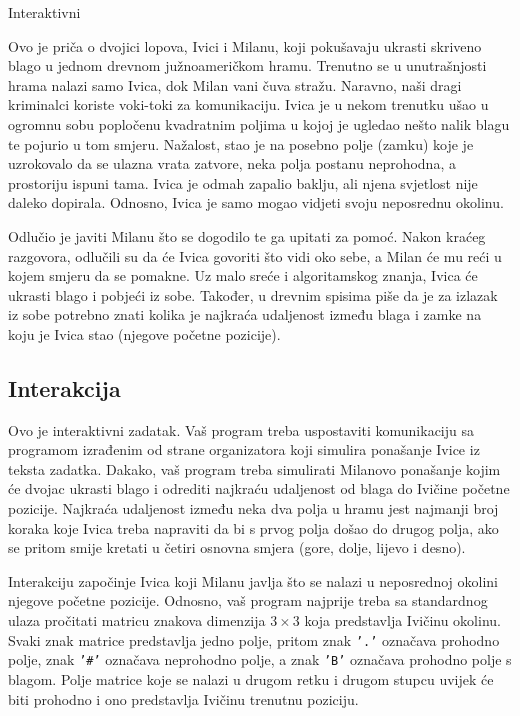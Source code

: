 \begin{statement}[
  problempoints=100,
  timelimit=1 sekunda,
  memorylimit=512 MiB,
]{Interaktivni}

Ovo je priča o dvojici lopova, Ivici i Milanu, koji pokušavaju ukrasti skriveno
blago u jednom drevnom južnoameričkom hramu. Trenutno se u unutrašnjosti
hrama nalazi samo Ivica, dok Milan vani čuva stražu. Naravno, naši dragi
kriminalci koriste voki-toki za komunikaciju. Ivica je u nekom trenutku ušao
u ogromnu sobu popločenu kvadratnim poljima u kojoj je ugledao nešto nalik
blagu te pojurio u tom smjeru. Nažalost, stao je na posebno polje (zamku)
koje je uzrokovalo da se ulazna vrata zatvore, neka polja postanu neprohodna,
a prostoriju ispuni tama. Ivica je odmah zapalio baklju, ali njena svjetlost
nije daleko dopirala.  Odnosno, Ivica je samo mogao vidjeti svoju neposrednu
okolinu.

Odlučio je javiti Milanu što se dogodilo te ga upitati za pomoć. Nakon kraćeg
razgovora, odlučili su da će Ivica govoriti što vidi oko sebe, a Milan će mu
reći u kojem smjeru da se pomakne. Uz malo sreće i algoritamskog znanja, Ivica
će ukrasti blago i pobjeći iz sobe. Također, u drevnim spisima piše da je za
izlazak iz sobe potrebno znati kolika je najkraća udaljenost između blaga i
zamke na koju je Ivica stao (njegove početne pozicije).


\subsection*{Interakcija}
Ovo je interaktivni zadatak. Vaš program treba uspostaviti komunikaciju sa
programom izrađenim od strane organizatora koji simulira ponašanje Ivice iz
teksta zadatka. Dakako, vaš program treba simulirati Milanovo ponašanje kojim
će dvojac ukrasti blago i odrediti najkraću udaljenost od blaga do Ivičine
početne pozicije. Najkraća udaljenost između neka dva polja u hramu jest
najmanji broj koraka koje Ivica treba napraviti da bi s prvog polja došao do
drugog polja, ako se pritom smije kretati u četiri osnovna smjera (gore,
dolje, lijevo i desno).

Interakciju započinje Ivica koji Milanu javlja što se nalazi u neposrednoj
okolini njegove početne pozicije. Odnosno, vaš program najprije treba sa
standardnog ulaza pročitati matricu znakova dimenzija $3\times3$ koja
predstavlja Ivičinu okolinu. Svaki znak matrice predstavlja jedno polje,
pritom znak \texttt{'.'} označava prohodno polje, znak \texttt{'\#'} označava
neprohodno polje, a znak \texttt{'B'} označava prohodno polje s blagom. Polje
matrice koje se nalazi u drugom retku i drugom stupcu uvijek će biti prohodno
i ono predstavlja Ivičinu trenutnu poziciju.


\end{statement}
